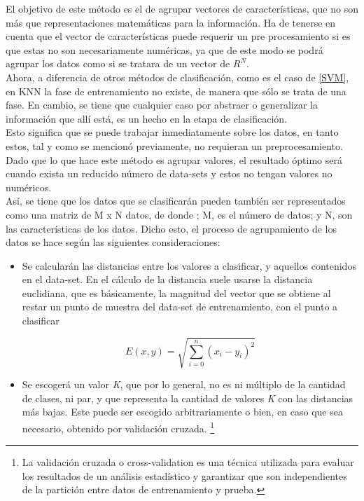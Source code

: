 \begin{itemize}
{\begin{enumerate}
\begin{enumerate}
{                El objetivo de este método es el de agrupar vectores de características, que no son más que representaciones matemáticas para la información. Ha de tenerse en cuenta que el vector de características puede requerir un pre procesamiento si es que estas no son necesariamente numéricas, ya que de este modo se podrá agrupar los datos como si se tratara de un vector de $R^{N}$.\\

                Ahora, a diferencia de otros métodos de clasificación, como es el caso de \ref{SVM}, en KNN la fase de entrenamiento no existe, de manera que sólo se trata de una fase. En cambio, se tiene que cualquier caso por abstraer o generalizar la información que allí está, es un hecho en la etapa de clasificación.\\

                Esto significa que se puede trabajar inmediatamente sobre los datos, en tanto estos, tal y como se mencionó previamente, no requieran un preprocesamiento. Dado que lo que hace este método es agrupar valores, el resultado óptimo será cuando exista un reducido número de  data-sets y estos no tengan valores no numéricos.\\

                Así, se tiene que los datos que se clasificarán pueden también ser representados como una matriz de M x N  datos, de donde ; M, es el número de datos; y N, son las características de los datos. Dicho esto, el proceso de agrupamiento de los datos se hace según las siguientes consideraciones:\\

                \begin{itemize}
                    \item {Se calcularán las distancias entre los valores a clasificar, y aquellos contenidos en el data-set. En el cálculo de la distancia suele usarse la distancia euclidiana, que es básicamente, la magnitud del vector que se obtiene al restar un punto de muestra del data-set de entrenamiento, con el punto a clasificar
    
                    \begin{equation}
                        E(x,y) = \sqrt{\sum_{i=0}^{n}({x_{i}-y_{i}})^{2}}
                    \end{equation}
                    }

                    \item{Se escogerá un valor \textit{K}, que por lo general, no es ni múltiplo de la cantidad de clases, ni par, y que representa la cantidad de valores \textit{K} con las distancias más bajas. Este puede ser escogido arbitrariamente o bien, en caso que sea necesario, obtenido por validación cruzada. \footnote{La validación cruzada o cross-validation es una técnica utilizada para evaluar los resultados de un análisis estadístico y garantizar que son independientes de la partición entre datos de entrenamiento y prueba.}}
                    

\end{itemize}}
\end{enumerate}
\end{enumerate}}
\end{itemize}
